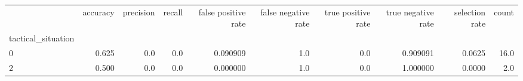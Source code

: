 \begin{tabular}{lrrrrrrrrr}
\toprule
{} &  accuracy &  precision &  recall &  false positive rate &  false negative rate &  true positive rate &  true negative rate &  selection rate &  count \\
tactical\_situation &           &            &         &                      &                      &                     &                     &                 &        \\
\midrule
0                  &     0.625 &        0.0 &     0.0 &             0.090909 &                  1.0 &                 0.0 &            0.909091 &          0.0625 &   16.0 \\
2                  &     0.500 &        0.0 &     0.0 &             0.000000 &                  1.0 &                 0.0 &            1.000000 &          0.0000 &    2.0 \\
\bottomrule
\end{tabular}

